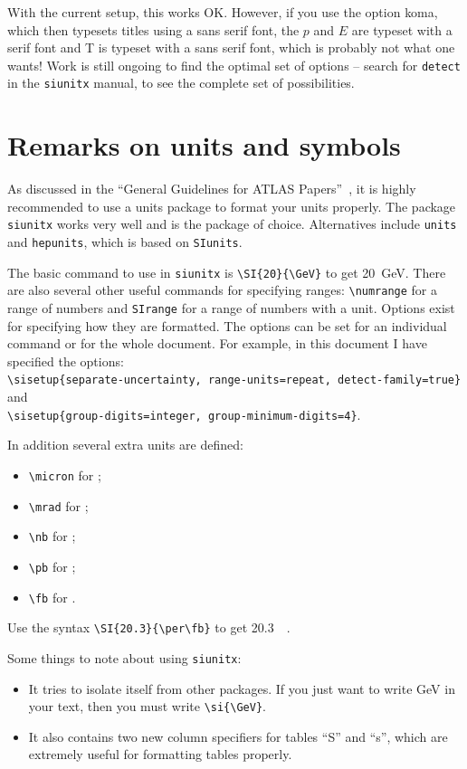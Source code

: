 \documentclass[atlasstyle,UKenglish]{latex/atlasdoc}
\newcommand{\Option}[1]{\textsf{#1}\xspace}
\newcommand{\Package}[1]{\texttt{#1}\xspace}
\begin{document}
With the current setup, this works OK. 
However, if you use the option \Option{koma}, which then typesets titles using a sans serif font,
the $p$ and $E$ are typeset with a serif font and \textsf{T} is typeset with a sans serif font,
which is probably not what one wants!
Work is still ongoing to find the optimal set of options
-- search for \texttt{detect} in the \Package{siunitx} manual, to see the complete set of possibilities.


\section{Remarks on units and symbols}

As discussed in the \enquote{General Guidelines for ATLAS Papers}~\cite{atlas-paper},
it is highly recommended to use a units package to format your units properly.
The package \Package{siunitx} works very well and is the package of choice.
Alternatives include \Package{units} and \Package{hepunits},
which is based on \Package{SIunits}.

The basic command to use in \Package{siunitx} is \verb|\SI{20}{\GeV}| to get
\SI{20}{\GeV}. 
There are also several other useful commands for specifying ranges:
\verb|\numrange| for a range of numbers and \verb|SIrange| for a range of numbers with a unit. 
Options exist for specifying how they are formatted.
The options can be set for an individual command or for the whole document.
For example, in this document I have specified the options:\\
\verb|\sisetup{separate-uncertainty, range-units=repeat, detect-family=true}|
and\\
\verb|\sisetup{group-digits=integer, group-minimum-digits=4}|.

In addition several extra units are defined:
\begin{itemize}
\item \verb|\micron| for \si{\micron};
\item \verb|\mrad| for \si{\mrad};
\item \verb|\nb| for \si{\nb};
\item \verb|\pb| for \si{\pb};
\item \verb|\fb| for \si{\fb}.
\end{itemize}
Use the syntax \verb|\SI{20.3}{\per\fb}| to get \SI{20.3}{\per\fb}.

Some things to note about using \Package{siunitx}:
\begin{itemize}
\item It tries to isolate itself from other packages.
  If you just want to write \si{\GeV} in your text,
  then you must write \verb|\si{\GeV}|.
\item It also contains two new column specifiers for tables ``S'' and ``s'',
  which are extremely useful for formatting tables properly.
\end{itemize}
\end{document}
